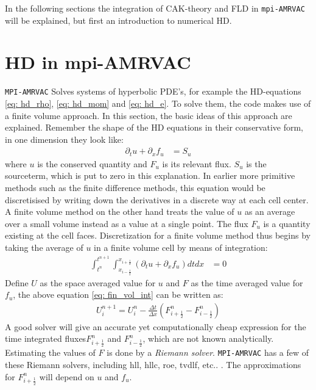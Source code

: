 In the following sections the integration of CAK-theory and FLD in \texttt{mpi-AMRVAC} will be explained, but first an introduction to numerical HD.


\section{HD in mpi-AMRVAC}
\texttt{MPI-AMRVAC} Solves systems of hyperbolic PDE's, for example the HD-equations \eqref{eq: hd_rho}, \eqref{eq: hd_mom} and \eqref{eq: hd_e}. To solve them, the code makes use of a finite volume approach. In this section, the basic ideas of this approach are explained. Remember the shape of the HD equations in their conservative form, in one dimension they look like:
\begin{align}
\partial_t u + \partial_x f_u &= S_u \label{eq: cons form}
\end{align}
where $u$ is the conserved quantity and $F_u$ is its relevant flux. $S_u$ is the sourceterm, which is put to zero in this explanation. In earlier more primitive methods such as the finite difference methods, this equation would be discretisised by writing down the derivatives in a discrete way at each cell center. A finite volume method on the other hand treats the value of $u$ as an average over a small volume instead as a value at a single point. The flux $F_u$ is a quantity existing at the cell faces. Discretization for a finite volume method thus begins by taking the average of $u$ in a finite volume cell by means of integration:
\begin{align} 
\int_{t^n}^{t^{n+1}} \int_{x_{i-\frac{1}{2}}}^{x_{i+\frac{1}{2}}} \left( \partial_t u + \partial_x f_u \right) dt dx &= 0  \label{eq: fin_vol_int}
\end{align}
Define $U$ as the space averaged value for $u$ and $F$ as the time averaged value for $f_u$, the above equation \ref{eq: fin_vol_int} can be written as:
\begin{align}
U^{n+1}_i = U^n_i - \frac{\Delta t}{\Delta x}\left(F^n_{i+\frac{1}{2}} - F^n_{i-\frac{1}{2}} \right) 
\end{align}
A good solver will give an accurate yet computationally cheap expression for the time integrated fluxes$F^n_{i+\frac{1}{2}}$ and $F^n_{i-\frac{1}{2}}$, which are not known analytically. Estimating the values of $F$ is done by a \emph{Riemann solver}. \texttt{MPI-AMRVAC} has a few of these Riemann solvers, including  hll, hllc, roe, tvdlf, etc.. \citep{Toth1996}. The approximations for $F^n_{i+\frac{1}{2}}$ will depend on $u$ and $f_u$.\\ 

